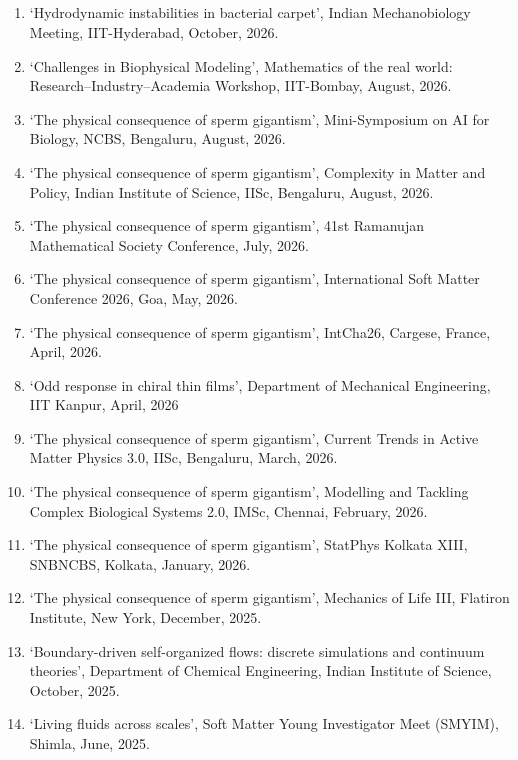 \documentclass[10pt]{res} %
\begin{document}
\begin{resume}
\section{}


\begin{enumerate}
	\vspace*{5mm}
	\item `Hydrodynamic instabilities in bacterial carpet',  Indian Mechanobiology Meeting, IIT-Hyderabad, October, 2026.
	\item `Challenges in Biophysical Modeling',  Mathematics of the real world: Research–Industry–Academia Workshop, IIT-Bombay, August, 2026.
	\item `The physical consequence of sperm gigantism',  Mini-Symposium on AI for Biology, NCBS, Bengaluru, August, 2026.
	\item `The physical consequence of sperm gigantism',  Complexity in Matter and Policy, Indian Institute of Science, IISc, Bengaluru, August, 2026.
	\item `The physical consequence of sperm gigantism',  41st Ramanujan Mathematical Society Conference, July, 2026.
	\item `The physical consequence of sperm gigantism',  International Soft Matter Conference 2026, Goa, May, 2026.
	\item `The physical consequence of sperm gigantism', IntCha26, Cargese, France, April, 2026.
	\item `Odd response in chiral thin films',  Department of Mechanical Engineering, IIT Kanpur, April, 2026
	\item `The physical consequence of sperm gigantism', Current Trends in Active Matter Physics 3.0, IISc, Bengaluru, March, 2026.
	\item `The physical consequence of sperm gigantism', Modelling and Tackling Complex Biological Systems 2.0, IMSc, Chennai, February, 2026.
	\item `The physical consequence of sperm gigantism', StatPhys Kolkata XIII, SNBNCBS, Kolkata, January, 2026.
	\item `The physical consequence of sperm gigantism', Mechanics of Life III, Flatiron Institute, New York, December, 2025.
	\item `Boundary-driven self-organized flows: discrete simulations and continuum theories', Department of Chemical Engineering, Indian Institute of Science, October, 2025.
	\item `Living fluids across scales', Soft Matter Young Investigator Meet (SMYIM), Shimla, June, 2025.

\end{enumerate}
\end{resume}
\end{document}
